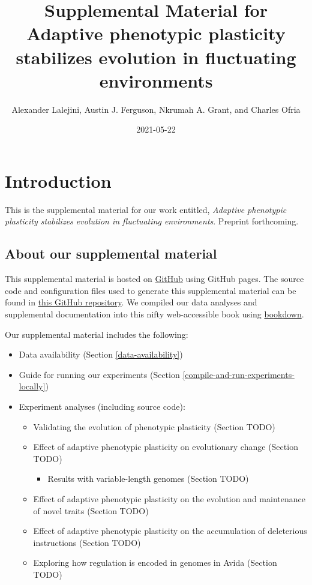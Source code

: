 \documentclass[]{book}
\title{Supplemental Material for Adaptive phenotypic plasticity stabilizes evolution in fluctuating environments}
\author{Alexander Lalejini, Austin J. Ferguson, Nkrumah A. Grant, and Charles Ofria}
\date{2021-05-22}
\providecommand{\tightlist}{%
  \setlength{\itemsep}{0pt}\setlength{\parskip}{0pt}}
\begin{document}
\maketitle

{
\setcounter{tocdepth}{1}
\tableofcontents
}
\hypertarget{introduction}{%
\chapter{Introduction}\label{introduction}}

This is the supplemental material for our work entitled, \emph{Adaptive phenotypic plasticity stabilizes evolution in fluctuating environments}.
Preprint forthcoming.

\hypertarget{about-our-supplemental-material}{%
\section{About our supplemental material}\label{about-our-supplemental-material}}

This supplemental material is hosted on \href{https://github.com/}{GitHub} using GitHub pages.
The source code and configuration files used to generate this supplemental material can be found in \href{https://github.com/amlalejini/evolutionary-consequences-of-plasticity}{this GitHub repository}.
We compiled our data analyses and supplemental documentation into this nifty web-accessible book using \href{https://bookdown.org/}{bookdown}.

Our supplemental material includes the following:

\begin{itemize}
\tightlist
\item
  Data availability (Section \ref{data-availability})
\item
  Guide for running our experiments (Section \ref{compile-and-run-experiments-locally})
\item
  Experiment analyses (including source code):

  \begin{itemize}
  \tightlist
  \item
    Validating the evolution of phenotypic plasticity (Section TODO)
  \item
    Effect of adaptive phenotypic plasticity on evolutionary change (Section TODO)

    \begin{itemize}
    \tightlist
    \item
      Results with variable-length genomes (Section TODO)
    \end{itemize}
  \item
    Effect of adaptive phenotypic plasticity on the evolution and maintenance of novel traits (Section TODO)
  \item
    Effect of adaptive phenotypic plasticity on the accumulation of deleterious instructions (Section TODO)
  \item
    Exploring how regulation is encoded in genomes in Avida (Section TODO)
  \end{itemize}
\end{itemize}
\end{document}
